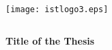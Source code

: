 
\thispagestyle{empty}

\newcommand{\myfontA}{\LARGE} \newcommand{\myfontB}{\Large} \newcommand{\myfontC}{\large} 

\singlespace


$ $ \vspace{-3cm}

\begin{minipage}[t]{5cm}
 \texttt{[image: istlogo3.eps]} %
\end{minipage}


\vspace*{-0.5cm} %
\begin{center}
$ $ \\
\end{center}




\vfill

\onehalfspace
\begin{center}
  \myfontA
  {\bf Title of the Thesis}
\end{center}
\singlespace


\vfill

